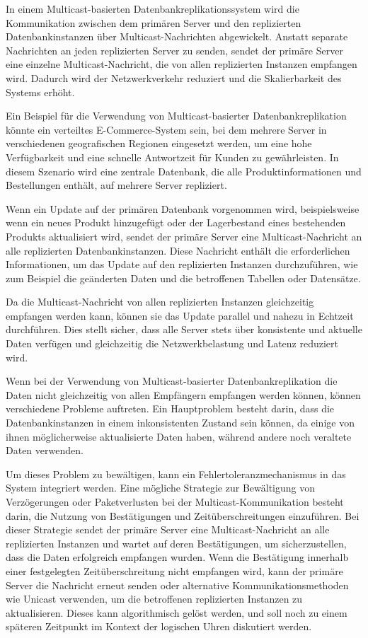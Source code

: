 In einem Multicast-basierten Datenbankreplikationssystem wird die Kommunikation zwischen dem primären Server und den replizierten Datenbankinstanzen über Multicast-Nachrichten abgewickelt. Anstatt separate Nachrichten an jeden replizierten Server zu senden, sendet der primäre Server eine einzelne Multicast-Nachricht, die von allen replizierten Instanzen empfangen wird. Dadurch wird der Netzwerkverkehr reduziert und die Skalierbarkeit des Systems erhöht.

Ein Beispiel für die Verwendung von Multicast-basierter Datenbankreplikation könnte ein verteiltes E-Commerce-System sein, bei dem mehrere Server in verschiedenen geografischen Regionen eingesetzt werden, um eine hohe Verfügbarkeit und eine schnelle Antwortzeit für Kunden zu gewährleisten. In diesem Szenario wird eine zentrale Datenbank, die alle Produktinformationen und Bestellungen enthält, auf mehrere Server repliziert.

Wenn ein Update auf der primären Datenbank vorgenommen wird, beispielsweise wenn ein neues Produkt hinzugefügt oder der Lagerbestand eines bestehenden Produkts aktualisiert wird, sendet der primäre Server eine Multicast-Nachricht an alle replizierten Datenbankinstanzen. Diese Nachricht enthält die erforderlichen Informationen, um das Update auf den replizierten Instanzen durchzuführen, wie zum Beispiel die geänderten Daten und die betroffenen Tabellen oder Datensätze.

Da die Multicast-Nachricht von allen replizierten Instanzen gleichzeitig empfangen werden kann, können sie das Update parallel und nahezu in Echtzeit durchführen. Dies stellt sicher, dass alle Server stets über konsistente und aktuelle Daten verfügen und gleichzeitig die Netzwerkbelastung und Latenz reduziert wird.

Wenn bei der Verwendung von Multicast-basierter Datenbankreplikation die Daten nicht gleichzeitig von allen Empfängern empfangen werden können, können verschiedene Probleme auftreten. Ein Hauptproblem besteht darin, dass die Datenbankinstanzen in einem inkonsistenten Zustand sein können, da einige von ihnen möglicherweise aktualisierte Daten haben, während andere noch veraltete Daten verwenden.

Um dieses Problem zu bewältigen, kann ein Fehlertoleranzmechanismus in das System integriert werden. Eine mögliche Strategie zur Bewältigung von Verzögerungen oder Paketverlusten bei der Multicast-Kommunikation besteht darin, die Nutzung von Bestätigungen und Zeitüberschreitungen einzuführen. Bei dieser Strategie sendet der primäre Server eine Multicast-Nachricht an alle replizierten Instanzen und wartet auf deren Bestätigungen, um sicherzustellen, dass die Daten erfolgreich empfangen wurden. Wenn die Bestätigung innerhalb einer festgelegten Zeitüberschreitung nicht empfangen wird, kann der primäre Server die Nachricht erneut senden oder alternative Kommunikationsmethoden wie Unicast verwenden, um die betroffenen replizierten Instanzen zu aktualisieren. Dieses kann algorithmisch gelöst werden, und soll noch zu einem späteren Zeitpunkt im Kontext der logischen Uhren diskutiert werden. 

